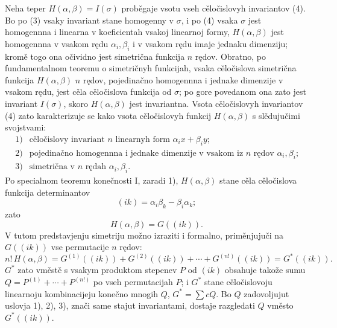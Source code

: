 \documentclass[11pt]{article}
\begin{document}
Neha teper \(H(\alpha,\beta)=I(\sigma)\) proběgaje vsotu vseh cěločislovyh invariantov (4). Bo po (3) vsaky invariant stane homogenny v \(\sigma\), i po (4) vsaka \(\sigma\) jest homogennna i linearna v koeficientah vsakoj linearnoj formy, \(H(\alpha,\beta)\) jest homogennna v vsakom rędu \(\alpha_i,\beta_i\) i v vsakom rędu imaje jednaku dimenziju; kromě togo ona očividno jest simetrična funkcija \(n\) rędov. Obratno, po fundamentalnom teoremu o simetričnyh funkcijah, vsaka cěločislova simetrična funkcija \(H(\alpha,\beta)\) \(n\) rędov, pojedinačno homogennna i jednake dimenzije v vsakom rędu, jest cěla cěločislova funkcija od \(\sigma\); po gore povedanom ona zato jest invariant \(I(\sigma)\), skoro \(H(\alpha,\beta)\) jest invariantna. Vsota cěločislovyh invariantov (4) zato karakterizuje se kako vsota cěločislovyh funkcij \(H(\alpha,\beta)\) s slědujučimi svojstvami:
\[
\begin{array}{ll}
1) & \text{cěločislovy invariant \(n\) linearnyh form \(\alpha_i x+\beta_i y\);}\\
2) & \text{pojedinačno homogennna i jednake dimenzije v vsakom iz \(n\) rędov \(\alpha_i,\beta_i\);}\\
3) & \text{simetrična v \(n\) rędah \(\alpha_i,\beta_i\).}
\end{array}
\]
Po specialnom teoremu konečnosti I, zaradi 1), \(H(\alpha,\beta)\) stane cěla cěločislova funkcija determinantov
\[
        (ik)=\alpha_i\beta_k-\beta_i\alpha_k;
\]
zato
\[
        H(\alpha,\beta)=G((ik)).
\]
V tutom predstavjenju simetriju možno izraziti i formalno, priměnjujuči na \(G((ik))\) vse permutacije \(n\) rędov:
\begin{equation}
        n!\,H(\alpha,\beta)
        =
        G^{(1)}((ik))+G^{(2)}((ik))+\cdots+G^{(n!)}((ik))
        =G^*((ik)).
\end{equation}
\(G^*\) zato vměstě s vsakym produktom stepenev \(P\) od \((ik)\) obsahuje takože sumu \(Q=P^{(1)}+\cdots+P^{(n!)}\) po vseh permutacijah \(P\); i \(G^*\) stane cěločislovoju linearnoju kombinacijeju konečno mnogih \(Q\), \(G^*=\sum cQ\). Bo \(Q\) zadovoljujut uslovja 1), 2), 3), znači same stajut invariantami, dostaje razgledati \(Q\) vměsto \(G^*((ik))\).
\end{document}
